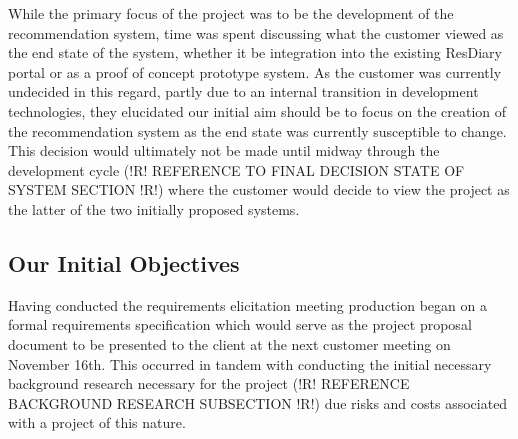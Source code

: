 \documentclass{l3proj}
\begin{document}
While the primary focus of the project was to be the development of the recommendation system, time was spent discussing what the customer viewed as the end state of the system, whether it be integration into the existing ResDiary portal or as a proof of concept prototype system. As the customer was currently undecided in this regard, partly due to an internal transition in development technologies, they elucidated our initial aim should be to focus on the creation of the recommendation system as the end state was currently susceptible to change. This decision would ultimately not be made until midway through the development cycle (!R! REFERENCE TO FINAL DECISION STATE OF SYSTEM SECTION !R!) where the customer would decide to view the project as the latter of the two initially proposed systems.


\subsection{Our Initial Objectives}
\label{ourinitobjectives}





Having conducted the requirements elicitation meeting production began on a formal requirements specification which would serve as the project proposal document to be presented to the client at the next customer meeting on November 16th. This occurred in tandem with conducting the initial necessary background research necessary for the project (!R! REFERENCE BACKGROUND RESEARCH SUBSECTION !R!) due risks and costs associated with a project of this nature.
\end{document}
